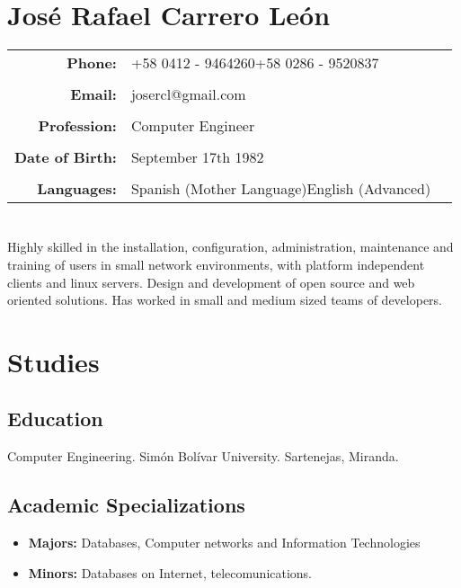\documentclass[letterpaper,11pt]{report}
\begin{document}
\section*{José Rafael Carrero León}

\begin{tabular}{r p{2.4in} p{46mm}}
\textbf{Phone:}&+58 0412 - 9464260\newline +58 0286 - 9520837&\\
 & & \\
\textbf{Email:}&josercl@gmail.com&\\
 & & \\
\textbf{Profession:}&Computer Engineer&\\
 & & \\
\textbf{Date of Birth:}&September 17th 1982&\\
 & & \\
\textbf{Languages:}&Spanish (Mother Language)\newline English (Advanced)&\\
\end{tabular}

\section*{}
Highly skilled in the installation, configuration, administration, maintenance and training of users in small network environments, with
platform independent clients and linux servers. Design and development of open source and web oriented solutions. Has worked in small and medium 
sized teams of developers.

\section*{Studies}
\subsection*{Education}
Computer Engineering. Simón Bolívar University. Sartenejas, Miranda.
\subsection*{Academic Specializations}
\begin{itemize}
\item
\textbf{Majors:} Databases, Computer networks and Information Technologies
\item
\textbf{Minors:} Databases on Internet, telecomunications.
\end{itemize}
\end{document}
